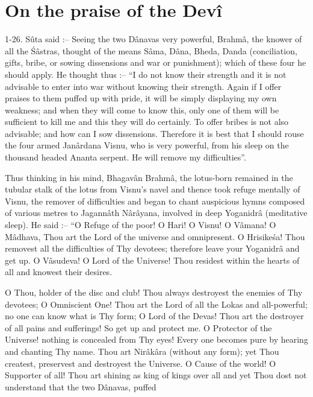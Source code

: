 \chapter{On the praise of the Dev\^i}

1-26. S\^uta said :-- Seeing the two D\^anavas very powerful, Brahm\^a, the knower of all the \'S\^astras, thought of the means S\^ama, D\^ana, Bheda, Danda (conciliation, gifts, bribe, or sowing dissensions and war or punishment); which of these four he should apply. He thought thus :-- ``I do not know their strength and it is not advisable to enter into war without knowing their strength. Again if I offer praises to them puffed up with pride, it will be simply displaying my own weakness; and when they will come to know this, only one of them will be sufficient to kill me and this they will do certainly. To offer bribes is not also advisable; and how can I sow dissensions. Therefore it is best that I should rouse the four armed Jan\^ardana Visnu, who is very powerful, from his sleep on the thousand headed Ananta serpent. He will remove my difficulties''.

Thus thinking in his mind, Bhagav\^an Brahm\^a, the lotus-born remained in the tubular stalk of the lotus from Visnu's navel and thence took refuge mentally of Visnu, the remover of difficulties and began to chant auspicious hymns composed of various metres to Jagann\^ath N\^ar\^ayana, involved in deep Yoganidr\^a (meditative sleep). He said :-- ``O Refuge of the poor! O Hari! O Visnu! O V\^amana! O M\^adhava, Thou art the Lord of the universe and omnipresent. O Hrisike\'sa! Thou removest all the difficulties of Thy devotees; therefore leave your Yoganidr\^a and get up. O V\^asudeva! O Lord of the Universe! Thou residest within the hearts of all and knowest their desires.

O Thou, holder of the disc and club! Thou always destroyest the enemies of Thy devotees; O Omniscient One! Thou art the Lord of all the Lokas and all-powerful; no one can know what is Thy form; O Lord of the Devas! Thou art the destroyer of all pains and sufferings! So get up and protect me. O Protector of the Universe! nothing is concealed from Thy eyes! Every one becomes pure by hearing and chanting Thy name. Thou art Nir\^ak\^ara (without any form); yet Thou createst, preservest and destroyest the Universe. O Cause of the world! O Supporter of all! Thou art shining as king of kings over all and yet Thou dost not understand that the two D\^anavas, puffed

